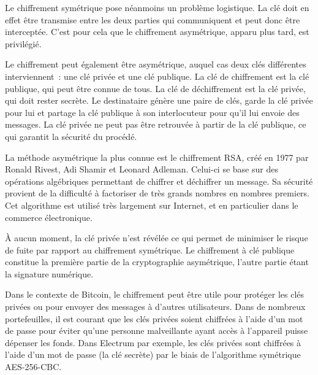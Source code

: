 Le chiffrement symétrique pose néanmoins un problème logistique. La clé doit en effet être transmise entre les deux parties qui communiquent et peut donc être interceptée. C'est pour cela que le chiffrement asymétrique, apparu plus tard, est privilégié.


Le chiffrement peut également être asymétrique, auquel cas deux clés différentes interviennent~: une clé privée et une clé publique. La clé de chiffrement est la clé publique, qui peut être connue de tous. La clé de déchiffrement est la clé privée, qui doit rester secrète. Le destinataire génère une paire de clés, garde la clé privée pour lui et partage la clé publique à son interlocuteur pour qu'il lui envoie des messages. La clé privée ne peut pas être retrouvée à partir de la clé publique, ce qui garantit la sécurité du procédé.

La méthode asymétrique la plus connue est le chiffrement RSA, créé en 1977 par Ronald Rivest, Adi Shamir et Leonard Adleman. Celui-ci se base sur des opérations algébriques permettant de chiffrer et déchiffrer un message. Sa sécurité provient de la difficulté à factoriser de très grands nombres en nombres premiers. Cet algorithme est utilisé très largement sur Internet, et en particulier dans le commerce électronique.

À aucun moment, la clé privée n'est révélée ce qui permet de minimiser le risque de fuite par rapport au chiffrement symétrique. Le chiffrement à clé publique constitue la première partie de la cryptographie asymétrique, l'autre partie étant la signature numérique.


Dans le contexte de Bitcoin, le chiffrement peut être utile pour protéger les clés privées ou pour envoyer des messages à d'autres utilisateurs. Dans de nombreux portefeuilles, il est courant que les clés privées soient chiffrées à l'aide d'un mot de passe pour éviter qu'une personne malveillante ayant accès à l'appareil puisse dépenser les fonds. Dans Electrum par exemple, les clés privées sont chiffrées à l'aide d'un mot de passe (la clé secrète) par le biais de l'algorithme symétrique AES-256-CBC.


